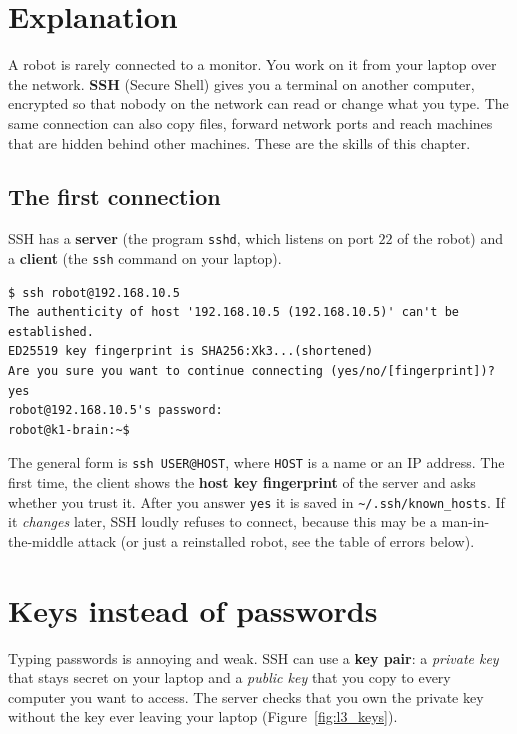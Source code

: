 \label{ch:linux3}

\section*{Explanation}
A robot is rarely connected to a monitor. You work on it from your laptop over the network. \textbf{SSH} (Secure Shell) gives you a terminal on another computer, encrypted so that nobody on the network can read or change what you type. The same connection can also copy files, forward network ports and reach machines that are hidden behind other machines. These are the skills of this chapter.

\subsection*{The first connection}
SSH has a \textbf{server} (the program \texttt{sshd}, which listens on port $22$ of the robot) and a \textbf{client} (the \texttt{ssh} command on your laptop).
\begin{verbatim}
$ ssh robot@192.168.10.5
The authenticity of host '192.168.10.5 (192.168.10.5)' can't be established.
ED25519 key fingerprint is SHA256:Xk3...(shortened)
Are you sure you want to continue connecting (yes/no/[fingerprint])? yes
robot@192.168.10.5's password:
robot@k1-brain:~$
\end{verbatim}
The general form is \verb|ssh USER@HOST|, where \texttt{HOST} is a name or an IP address. The first time, the client shows the \textbf{host key fingerprint} of the server and asks whether you trust it. After you answer \texttt{yes} it is saved in \texttt{\textasciitilde/.ssh/known\_hosts}. If it \emph{changes} later, SSH loudly refuses to connect, because this may be a man-in-the-middle attack (or just a reinstalled robot, see the table of errors below).

\section*{Keys instead of passwords}
Typing passwords is annoying and weak. SSH can use a \textbf{key pair}: a \emph{private key} that stays secret on your laptop and a \emph{public key} that you copy to every computer you want to access. The server checks that you own the private key without the key ever leaving your laptop (Figure~\ref{fig:l3_keys}).

